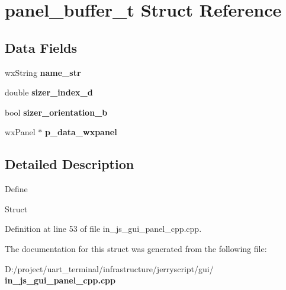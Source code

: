 \section{panel\+\_\+buffer\+\_\+t Struct Reference}
\label{structpanel__buffer__t}
\subsection*{Data Fields}
\begin{DoxyCompactItemize}
\item 
\mbox{\label{structpanel__buffer__t_a4f420117d8c68001f3c555687fee0d84}} 
wx\+String {\bfseries name\+\_\+str}
\item 
\mbox{\label{structpanel__buffer__t_aae99f717aadbf88f890c71a293468af8}} 
double {\bfseries sizer\+\_\+index\+\_\+d}
\item 
\mbox{\label{structpanel__buffer__t_a7dac49d74e11d058f831963b78f5ecb9}} 
bool {\bfseries sizer\+\_\+orientation\+\_\+b}
\item 
\mbox{\label{structpanel__buffer__t_a4342aca05065302b62ea53a407774a35}} 
wx\+Panel $\ast$ {\bfseries p\+\_\+data\+\_\+wxpanel}
\end{DoxyCompactItemize}


\subsection{Detailed Description}
Define

Struct 

Definition at line 53 of file in\+\_\+js\+\_\+gui\+\_\+panel\+\_\+cpp.\+cpp.



The documentation for this struct was generated from the following file\+:\begin{DoxyCompactItemize}
\item 
D\+:/project/uart\+\_\+terminal/infrastructure/jerryscript/gui/\textbf{ in\+\_\+js\+\_\+gui\+\_\+panel\+\_\+cpp.\+cpp}\end{DoxyCompactItemize}
